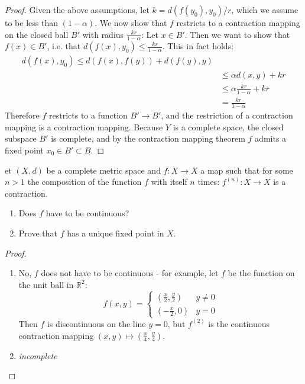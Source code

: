 \documentclass[12pt]{article}
\newcommand{\R}{\mathbb{R}}
\theoremstyle{definition}
\newenvironment{problem}[2][Problem]{\begin{trivlist}
\item[\hskip \labelsep {\bfseries #1}\hskip \labelsep {\bfseries #2.}]}{\end{trivlist}}
\begin{document}
\begin{proof}
	Given the above assumptions, let $k = d(f(y_0), y_0)/r$, which we assume to be less than $(1-\alpha)$. We now show that $f$ restricts to a contraction mapping on the closed ball $B'$ with radius $\frac{kr}{1-\alpha}$: Let $x \in B'$. Then we want to show that $f(x) \in B'$, i.e. that $d(f(x),y_0) \leq \frac{kr}{1-\alpha}$. This in fact holds:
	\begin{align*}
		d(f(x), y_0) \leq d(f(x), f(y)) + d(f(y), y)\\
		&\leq \alpha d(x,y) + kr\\
		&\leq \alpha \frac{kr}{1-\alpha} + kr\\
		&= \frac{kr}{1-\alpha}
	\end{align*}
	Therefore $f$ restricts to a function $B' \to B'$, and the restriction of a contraction mapping is a contraction mapping. Because $Y$ is a complete space, the closed subspace $B'$ is complete, and by the contraction mapping theorem $f$ admits a fixed point $x_0 \in B' \subset B$.
\end{proof}
\begin{problem}
	Let $(X,d)$ be a complete metric space and $f : X \to X$ a map such that for some $n > 1$ the composition of the function $f$ with itself $n$ times: $f^{(n)}: X \to X$ is a contraction.
	\begin{enumerate}[label=(\roman*)]
		\item Does $f$ have to be continuous?
		\item Prove that $f$ has a unique fixed point in $X$.
	\end{enumerate}
\end{problem}
\begin{proof}
	\begin{enumerate}[label=(\roman*)]
		\item No, $f$ does not have to be continuous - for example, let $f$ be the function on the unit ball in $\R^2$:
			\[f(x,y) = \begin{cases}
					(\frac{x}{2}, \frac{y}{2}) & y \neq 0\\
					(-\frac{x}{2}, 0) & y = 0
		\end{cases}\]
		Then $f$ is discontinuous on the line $y = 0$, but $f^{(2)}$ is the continuous contraction mapping $(x,y) \mapsto (\frac{x}{4}, \frac{y}{4})$. 
	\item \textit{incomplete}
	\end{enumerate}
\end{proof}
\begin{thebibliography}{}
\end{thebibliography}
\end{document}
